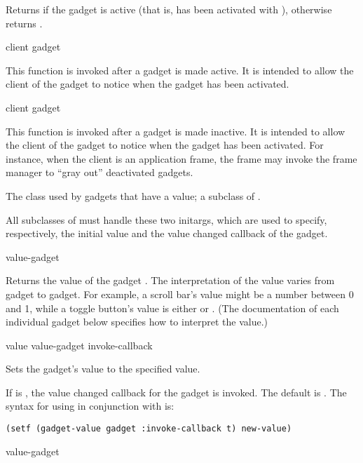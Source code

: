 Returns  if the gadget  is active (that is, has been activated
with ), otherwise returns .

 {client gadget}

This function is invoked after a gadget is made active.  It is intended to allow
the client of the gadget to notice when the gadget has been activated.

 {client gadget}

This function is invoked after a gadget is made inactive.  It is intended to
allow the client of the gadget to notice when the gadget has been activated.
For instance, when the client is an application frame, the frame may invoke the
frame manager to ``gray out'' deactivated gadgets.



The class used by gadgets that have a value; a subclass of .
\AbstractClass


All subclasses of  must handle these two initargs, which are
used to specify, respectively, the initial value and the value changed callback
of the gadget.

 {value-gadget}

Returns the value of the gadget .  The interpretation of the
value varies from gadget to gadget.  For example, a scroll bar's value might be
a number between 0 and 1, while a toggle button's value is either  or
.  (The documentation of each individual gadget below specifies how to
interpret the value.)

 {value value-gadget \key invoke-callback}

Sets the gadget's value to the specified value.

If  is , the value changed callback for the
gadget is invoked.  The default is .  The syntax for using
 in conjunction with  is:

\begin{verbatim}
(setf (gadget-value gadget :invoke-callback t) new-value)
\end{verbatim}

 {value-gadget}

